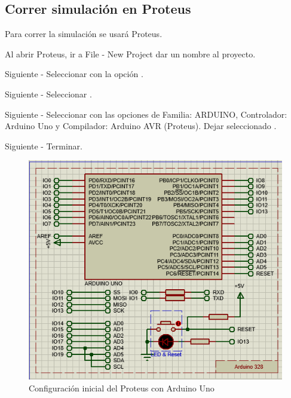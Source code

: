 \documentclass{article}
\begin{document}
    \subsection{Correr simulación en Proteus}

    Para correr la simulación se usará Proteus.

    \bigbreak

    Al abrir Proteus, ir a File - New Project dar un nombre al proyecto.

    \bigbreak

    Siguiente - Seleccionar 
    con la opción .

    \bigbreak

    Siguiente - Seleccionar .

    \bigbreak

    Siguiente - Seleccionar  con las opciones
    de Familia: ARDUINO, Controlador:
    Arduino Uno y Compilador: Arduino AVR (Proteus). Dejar seleccionado
    .

    \bigbreak

    Siguiente - Terminar.

    \begin{figure}[H]
        \centering
        \includegraphics[width=0.5\paperwidth]{images/sim-1.png}
        \caption{Configuración inicial del Proteus con Arduino Uno}
    \end{figure}
\end{document}
